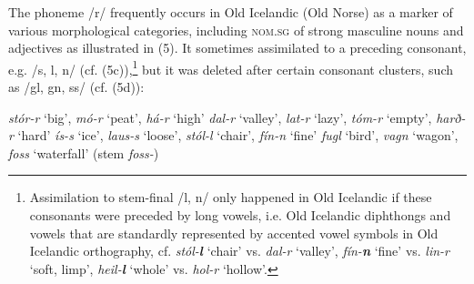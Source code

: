 \documentclass[output=paper,
modfonts
]{LSP/langsci}
\begin{document}
The phoneme /r/ frequently occurs in Old Icelandic (Old Norse) as a
marker of various morphological categories, including \textsc{nom.sg} of
strong masculine nouns and adjectives as illustrated in (5). It
sometimes assimilated to a preceding consonant, e.g. /s, l, n/ (cf.
(5c)),\footnote{Assimilation to stem-final /l, n/ only happened in Old
  Icelandic if these consonants were preceded by long vowels, i.e. Old
  Icelandic diphthongs and vowels that are standardly represented by
  accented vowel symbols in Old Icelandic orthography, cf.
  \emph{stól-\textbf{l}} `chair' vs. \emph{dal-r} `valley',
  \emph{fín-\textbf{n}} `fine' vs. \emph{lin-r} `soft, limp',
  \emph{heil-\textbf{l}} `whole' vs. \emph{hol-r} `hollow'.} but it was
deleted after certain consonant clusters, such as /gl, gn, ss/ (cf.
(5d)):

\ea
	\ea \emph{stór-r} `big', \emph{mó-r} `peat', \emph{há-r} `high'
	\ex \emph{dal-r} `valley', \emph{lat-r} `lazy', \emph{tóm-r} `empty', \emph{harð-r} `hard'
	\ex \emph{ís-s} `ice', \emph{laus-s} `loose', \emph{stól-l} `chair', \emph{fín-n} `fine'
	\ex \emph{fugl} `bird', \emph{vagn} `wagon', \emph{foss} `waterfall' (stem \emph{foss-})
	\z
\z
\end{document}
